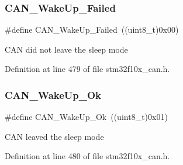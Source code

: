 \subsubsection{\texorpdfstring{C\+A\+N\+\_\+\+Wake\+Up\+\_\+\+Failed}{CAN\_WakeUp\_Failed}}
{\footnotesize\ttfamily \#define C\+A\+N\+\_\+\+Wake\+Up\+\_\+\+Failed~((uint8\+\_\+t)0x00)}

C\+AN did not leave the sleep mode 

Definition at line 479 of file stm32f10x\+\_\+can.\+h.

\mbox{\label{group___c_a_n__wake__up__constants_ga152e4935cf85bdfb803eb36b656cd690}} 
\subsubsection{\texorpdfstring{C\+A\+N\+\_\+\+Wake\+Up\+\_\+\+Ok}{CAN\_WakeUp\_Ok}}
{\footnotesize\ttfamily \#define C\+A\+N\+\_\+\+Wake\+Up\+\_\+\+Ok~((uint8\+\_\+t)0x01)}

C\+AN leaved the sleep mode 

Definition at line 480 of file stm32f10x\+\_\+can.\+h.


